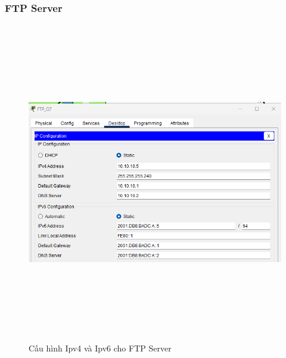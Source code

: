 \documentclass[a4paper, 12pt]{article}
\begin{document}
\subsubsection{FTP Server}
\begin{figure}[H]
    \centering
    \includegraphics[width=16cm, height=14cm]{img/4.2.3a.png}
    \caption{Cấu hình Ipv4 và Ipv6 cho FTP Server}
    \label{hinh423a}
\end{figure}
\end{document}
